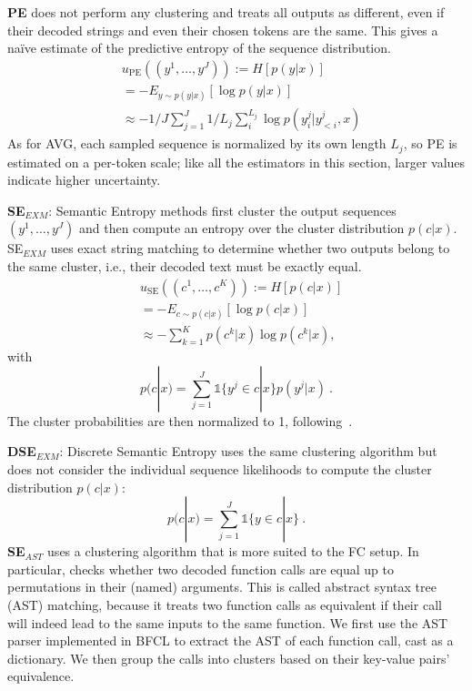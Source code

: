 \textbf{PE} does not perform any clustering and treats all outputs as different, even if their decoded strings and even their chosen tokens are the same. This gives a naïve estimate of the predictive entropy of the sequence distribution.
\begin{align}
&u_{\text{PE}}((y^1, \dots, y^J))
:= H[p(y|x)]
\\
&= -E_{y \sim p(y|x)}[\log p(y|x)] \\
&\approx -1/J \sum_{j=1}^{J} 1/L_j\sum_{i}^{L_j} \log p(y^{j}_i|y^{j}_{<i}, x)
\end{align}
As for AVG, each sampled sequence is normalized by its own length $L_j$, so PE is estimated on a per-token scale; like all the estimators in this section, larger values indicate higher uncertainty.

\textbf{SE}$_{EXM}$: Semantic Entropy \citep{farquhar2024detec} methods first cluster the output sequences $(y^1, \dots, y^J)$ and then compute an entropy over the cluster distribution $p(c | x)$. SE$_{EXM}$ uses exact string matching to determine whether two outputs belong to the same cluster, i.e., their decoded text must be exactly equal. 
\begin{align}
\label{eq:se}
&u_{\text{SE}}((c^1, \dots, c^K))
:= H[p(c | x)]
\\
&= -E_{c \sim p(c|x)}[\log p(c | x)] \\
&\approx - \sum_{k=1}^K p(c^k | x) \log p(c^k | x) ,
\end{align}
with 
\begin{equation}  \label{eq:se_clusterprob}
p(c | x) = \sum_{j=1}^J \mathds{1} \! \{ y^j \in c | x \} p(y^j | x) \ .
\end{equation}
The cluster probabilities are then normalized to 1, following~\citet{kuhn2023semantic}.


\textbf{DSE}$_{EXM}$: Discrete Semantic Entropy uses the same clustering algorithm but does not consider the individual sequence likelihoods to compute the cluster distribution $p(c | x)$:
\begin{equation}  \label{eq:dse}
p(c | x) = \sum_{j=1}^J \mathds{1} \! \{ y \in c | x \} \ .
\end{equation}
\textbf{SE}$_{AST}$ uses a clustering algorithm that is more suited to the FC setup. In particular, checks whether two decoded function calls are equal up to permutations in their (named) arguments. This is called abstract syntax tree (AST) matching, because it treats two function calls as equivalent if their call will indeed lead to the same inputs to the same function. We first use the AST parser implemented in BFCL to extract the AST of each function call, cast as a dictionary. We then group the calls into clusters based on their key-value pairs' equivalence.  

